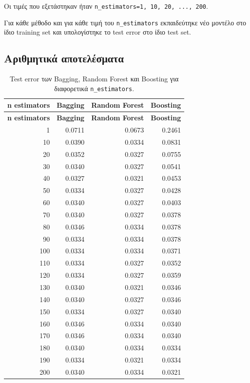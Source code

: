 \documentclass[12pt,a4paper]{article}
\newcommand{\code}[1]{\texttt{\textenglish{#1}}}
\begin{document}
Οι τιμές που εξετάστηκαν ήταν \code{n\_estimators=1, 10, 20, ..., 200}.

Για κάθε μέθοδο και για κάθε τιμή του \code{n\_estimators} εκπαιδεύτηκε νέο
μοντέλο στο ίδιο training set και υπολογίστηκε το test error στο ίδιο test set.

\subsection{Αριθμητικά αποτελέσματα}

\begin{longtable}{rrrr}
\caption{Test error των Bagging, Random Forest και Boosting για διαφορετικά \code{n\_estimators}.}
\label{tab:q6-errors}\\
\toprule
\textbf{n estimators} & \textbf{Bagging} & \textbf{Random Forest} & \textbf{Boosting} \\
\midrule
\endfirsthead
\toprule
\textbf{n estimators} & \textbf{Bagging} & \textbf{Random Forest} & \textbf{Boosting} \\
\midrule
\endhead
1   & 0.0711 & 0.0673 & 0.2461 \\
10  & 0.0390 & 0.0334 & 0.0831 \\
20  & 0.0352 & 0.0327 & 0.0755 \\
30  & 0.0340 & 0.0327 & 0.0541 \\
40  & 0.0327 & 0.0321 & 0.0453 \\
50  & 0.0334 & 0.0327 & 0.0428 \\
60  & 0.0340 & 0.0327 & 0.0403 \\
70  & 0.0340 & 0.0327 & 0.0378 \\
80  & 0.0346 & 0.0334 & 0.0378 \\
90  & 0.0334 & 0.0334 & 0.0378 \\
100 & 0.0334 & 0.0334 & 0.0371 \\
110 & 0.0334 & 0.0327 & 0.0352 \\
120 & 0.0334 & 0.0327 & 0.0359 \\
130 & 0.0340 & 0.0321 & 0.0346 \\
140 & 0.0340 & 0.0327 & 0.0346 \\
150 & 0.0334 & 0.0327 & 0.0340 \\
160 & 0.0346 & 0.0334 & 0.0340 \\
170 & 0.0346 & 0.0334 & 0.0340 \\
180 & 0.0340 & 0.0334 & 0.0334 \\
190 & 0.0334 & 0.0321 & 0.0334 \\
200 & 0.0340 & 0.0334 & 0.0321 \\
\bottomrule
\end{longtable}
\end{document}
